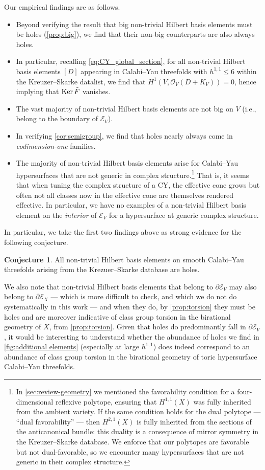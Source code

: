 \documentclass[11pt,dvipsnames]{article}
\theoremstyle{definition}
\newtheorem{conjecture}[theorem]{Conjecture}
\begin{document}
Our empirical findings are as follows. 
\begin{itemize}
    \item Beyond verifying the result that big non-trivial Hilbert basis elements must be holes (\cref{prop:big}), we find that their non-big counterparts are also always holes.
    \item In particular, recalling \cref{eq:CY_global_section}, for all non-trivial Hilbert basis elements $[D]$ appearing in Calabi--Yau threefolds with $h^{1,1}\leq 6$ within the Kreuzer--Skarke datalist, we find that $H^1(V, \mathcal{O}_V(D + K_V)) = 0$, hence implying that $\mathrm{Ker} \, \Tilde{F}$ vanishes. 
    \item The vast majority of non-trivial Hilbert basis elements are not big on $V$ (i.e., belong to the boundary of $\mathcal{E}_V$).
    \item In verifying \cref{cor:semigroup}, we find that holes nearly always come in \textit{codimension-one} families.
    \item The majority of non-trivial Hilbert basis elements arise for Calabi--Yau hypersurfaces that are not generic in complex structure.\footnote{In \cref{sec:review-geometry} we mentioned the favorability condition for a four-dimensional reflexive polytope, ensuring that $H^{1,1}(X)$ was fully inherited from the ambient variety. If the same condition holds for the dual polytope --- ``dual favorability'' --- then $H^{2,1}(X)$ is fully inherited from the sections of the anticanonical bundle: this duality is a consequence of mirror symmetry in the Kreuzer--Skarke database. We enforce that our polytopes are favorable but not dual-favorable, so we encounter many hypersurfaces that are not generic in their complex structure.} That is, it seems that when tuning the complex structure of a CY, the effective cone grows but often not all classes now in the effective cone are themselves rendered effective. In particular, we have no examples of a non-trivial Hilbert basis element on the \textit{interior} of $\mathcal{E}_V$ for a hypersurface at generic complex structure.
\end{itemize}
In particular, we take the first two findings above as strong evidence for the following conjecture.
\begin{conjecture}
    \label{conj:non_trivial_hb_are_holes}
    All non-trivial Hilbert basis elements on smooth Calabi--Yau threefolds arising from the Krezuer--Skarke database are holes.
\end{conjecture}
We also note that non-trivial Hilbert basis elements that belong to $\partial\mathcal{E}_V$ may also belong to $\partial\mathcal{E}_X$ --- which is more difficult to check, and which we do not do systematically in this work --- and when they do, by \cref{prop:torsion} they must be holes and are moreover indicative of class group torsion in the birational geometry of $X$, from \cref{prop:torsion}. Given that holes do predominantly fall in $\partial\mathcal{E}_V$, it would be interesting to understand whether the abundance of holes we find in \cref{fig:additional elements} (especially at large $h^{1,1}$) does indeed correspond to an abundance of class group torsion in the birational geometry of toric hypersurface Calabi--Yau threefolds.
\end{document}
